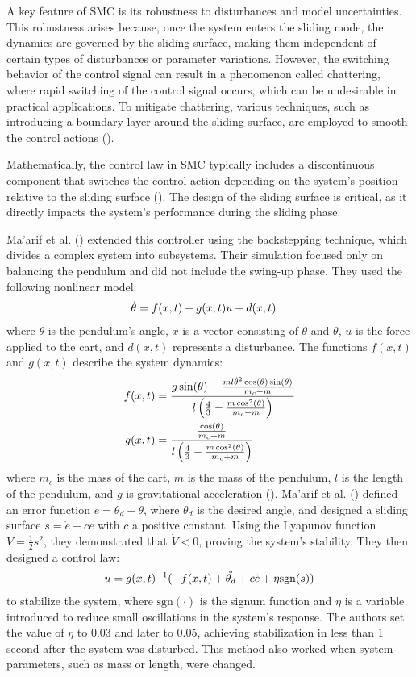 A key feature of SMC is its robustness to disturbances and model uncertainties. This robustness arises because, once the system enters the sliding mode, the dynamics are governed by the sliding surface, making them independent of certain types of disturbances or parameter variations. However, the switching behavior of the control signal can result in a phenomenon called chattering, where rapid switching of the control signal occurs, which can be undesirable in practical applications. To mitigate chattering, various techniques, such as introducing a boundary layer around the sliding surface, are employed to smooth the control actions (\cite{chalanga_output_2019}).

Mathematically, the control law in SMC typically includes a discontinuous component that switches the control action depending on the system's position relative to the sliding surface (\cite{mahmoud_optimizing_2021}). The design of the sliding surface is critical, as it directly impacts the system's performance during the sliding phase.

Ma'arif et al. (\citeyear{maarif_backstepping_2022}) extended this controller using the backstepping technique, which divides a complex system into subsystems. Their simulation focused only on balancing the pendulum and did not include the swing-up phase. They used the following nonlinear model:
\begin{align}
    \dot{\theta} &= f(x,t) + g(x,t)u + d(x,t) \notag
\end{align}
where $\theta$ is the pendulum's angle, $x$ is a vector consisting of $\theta$ and $\dot{\theta}$, $u$ is the force applied to the cart, and $d(x,t)$ represents a disturbance. The functions $f(x,t)$ and $g(x,t)$ describe the system dynamics:
\begin{align}
    f(x,t) &= \frac{g\sin(\theta) - \frac{ml\dot{\theta}^2\cos(\theta)\sin(\theta)}{m_c+m}}{l\left(\frac{4}{3}-\frac{m\cos^2(\theta)}{m_c+m}\right)} \notag \\
    g(x,t) &= \frac{\frac{\cos(\theta)}{m_c+m}}{l\left(\frac{4}{3}-\frac{m\cos^2(\theta)}{m_c+m}\right)} \notag
\end{align}
where $m_c$ is the mass of the cart, $m$ is the mass of the pendulum, $l$ is the length of the pendulum, and $g$ is gravitational acceleration (\cite{valluru_stabilization_2017}). Ma'arif et al. (\citeyear{maarif_backstepping_2022}) defined an error function $e = \theta_d - \theta$, where $\theta_d$ is the desired angle, and designed a sliding surface $s = \dot{e} + c e$ with $c$ a positive constant. Using the Lyapunov function $V=\frac{1}{2}s^2$, they demonstrated that $\dot{V}<0$, proving the system's stability. They then designed a control law:
\begin{align}
    u = g(x,t)^{-1}(-f(x,t) +\ddot{\theta_d} + c\dot{e} + \eta\text{sgn}(s)) \notag
\end{align}
to stabilize the system, where $\text{sgn}(\cdot)$ is the signum function and $\eta$ is a variable introduced to reduce small oscillations in the system's response. The authors set the value of $\eta$ to 0.03 and later to 0.05, achieving stabilization in less than 1 second after the system was disturbed. This method also worked when system parameters, such as mass or length, were changed.
